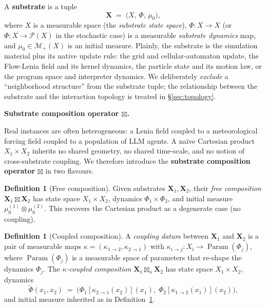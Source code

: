 \documentclass[journal]{IEEEtran}
\theoremstyle{plain}
\theoremstyle{definition}
\newtheorem{definition}[theorem]{Definition}
\theoremstyle{plain}
\newcounter{topic}[subsection]
\newcommand{\topic}[1]{%
  \refstepcounter{topic}%
  \par\smallskip\noindent\textbf{#1.}\ }
\DeclareMathOperator{\Param}{Param}
\newcommand{\Pmeas}{\mathcal{P}}
\newcommand{\Mplus}{\mathcal{M}_{+}}
\newcommand{\X}{\mathbf{X}}
\begin{document}
A \textbf{substrate} is a tuple
\[
  \X \;=\; \big( X, \, \Phi, \, \mu_0 \big),
\]
where $X$ is a measurable space (the \emph{substrate state space}),
$\Phi : X \to X$ (or $\Phi : X \to \Pmeas(X)$ in the stochastic case) is a
measurable \emph{substrate dynamics} map, and $\mu_0 \in \Mplus(X)$ is an
initial measure. Plainly, the substrate is the simulation material plus its
native update rule: the grid and cellular-automaton update, the Flow-Lenia
field and its kernel dynamics, the particle state and its motion law, or the
program space and interpreter dynamics. We deliberately \emph{exclude} a
``neighborhood structure'' from the substrate tuple; the relationship between
the substrate and the interaction topology is treated in \S\ref{sec:topology}.

\topic{\texorpdfstring{Substrate composition operator $\boxtimes$}{Substrate composition operator}}

Real instances are often heterogeneous: a Lenia field coupled to a
meteorological forcing field coupled to a population of LLM agents. A na\"ive
Cartesian product $X_1 \times X_2$ inherits no shared geometry, no shared
time-scale, and no notion of cross-substrate coupling. We therefore introduce
the \textbf{substrate composition operator} $\boxtimes$ in two flavours.

\begin{definition}[Free composition]\label{def:free-composition}
Given substrates $\X_1,\X_2$, their \emph{free composition}
$\X_1 \boxtimes \X_2$ has state space $X_1 \times X_2$, dynamics
$\Phi_1 \times \Phi_2$, and initial measure $\mu_0^{(1)} \otimes \mu_0^{(2)}$.
This recovers the Cartesian product as a degenerate case (no coupling).
\end{definition}

\begin{definition}[Coupled composition]\label{def:coupled-composition}
A \emph{coupling datum} between $\X_1$ and $\X_2$ is a pair of measurable maps
$\kappa = (\kappa_{1\to 2}, \kappa_{2\to 1})$ with
$\kappa_{i\to j} : X_i \to \Param(\Phi_j)$, where $\Param(\Phi_j)$ is a
measurable space of parameters that re-shape the dynamics $\Phi_j$. The
\emph{$\kappa$-coupled composition} $\X_1 \boxtimes_\kappa \X_2$ has state
space $X_1 \times X_2$, dynamics
\[
  \widetilde\Phi(x_1,x_2) \;=\;
  \big(\Phi_1[\kappa_{2\to 1}(x_2)](x_1),\; \Phi_2[\kappa_{1\to 2}(x_1)](x_2)\big),
\]
and initial measure inherited as in Definition~\ref{def:free-composition}.
\end{definition}
\end{document}
